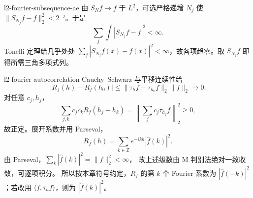 \begin{solution}{l2-fourier-subsequence-ae}
由 \(S_Nf\to f\) 于 \(L^2\)，可选严格递增 \(N_j\) 使
\(\|S_{N_j}f-f\|_2^2<2^{-j}\)。于是
\[
 \sum_j\int|S_{N_j}f-f|^2<\infty.
\]
Tonelli 定理给几乎处处
\(\sum_j|S_{N_j}f(x)-f(x)|^2<\infty\)，故各项趋零。取
\(S_{N_j}f\) 即得所需三角多项式列。
\end{solution}

\begin{solution}{l2-fourier-autocorrelation}
Cauchy--Schwarz 与平移连续性给
\[
 |R_f(h)-R_f(h_0)|
 \le\|\tau_hf-\tau_{h_0}f\|_2\|f\|_2\to0.
\]
对任意 \(c_j,h_j\)，
\[
 \sum_{j,k}c_j\overline{c_k}R_f(h_j-h_k)
 =\left\|\sum_jc_j\tau_{h_j}f\right\|_2^2\ge0,
\]
故正定。展开系数并用 Parseval，
\[
 R_f(h)=\sum_{k\in\mathbb Z}e^{-ikh}|\widehat f(k)|^2.
\]
由 Parseval，\(\sum_k|\widehat f(k)|^2=\|f\|_2^2<\infty\)，
故上述级数由 M 判别法绝对一致收敛，可逐项积分。
所以按本章符号约定，\(R_f\) 的第 \(k\) 个 Fourier 系数为
\(|\widehat f(-k)|^2\)；若改用 \(\langle f,\tau_hf\rangle\)，则为
\(|\widehat f(k)|^2\)。
\end{solution}
